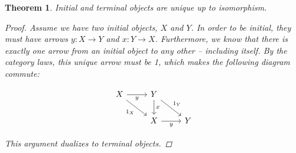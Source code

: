 \documentclass[]{article}
\newtheorem{theorem}{Theorem}
\newcommand{\cdr}[1]{\arrow[swap]{r}{#1}}
\newcommand{\cddr}[1]{\arrow[swap]{dr}{#1}}
\newcommand{\cdd}[1]{\arrow{d}{#1}}
\newcommand{\tfarr}[4][\to]{\ensuremath{#2 : #3 #1 #4}}
\begin{document}
\begin{theorem}
  Initial and terminal objects are unique up to isomorphism.
  \begin{proof}
    Assume we have two initial objects, $X$ and $Y$. In order to be initial,
    they must have arrows \tfarr{y}{X}{Y} and \tfarr{x}{Y}{X}. Furthermore, we
    know that there is exactly one arrow from an initial object to any other --
    including itself. By the category laws, this unique arrow must be 1, which
    makes the following diagram commute:

$$\begin{tikzcd}
  X \cdr{y} \cddr{1_X} & Y \cdd{x} \arrow{dr}{1_Y} \\
  & X \cdr{y} & Y
\end{tikzcd}$$

    This argument dualizes to terminal objects.

  \end{proof}
\end{theorem}
\end{document}
